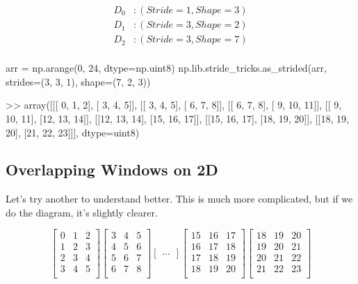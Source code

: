 \documentclass[oneside, 12pt]{report}
\begin{document}
\begin{align*}
D_0&:(Stride=1, Shape=3)\\
D_1&:(Stride=3, Shape=2)\\
D_2&:(Stride=3, Shape=7)\\
\end{align*}

\begin{python}
arr = np.arange(0, 24, dtype=np.uint8)
np.lib.stride_tricks.as_strided(arr, strides=(3, 3, 1), shape=(7, 2, 3))

>> array([[[ 0,  1,  2],
       	   [ 3,  4,  5]],
          [[ 3,  4,  5],
           [ 6,  7,  8]],
          [[ 6,  7,  8],
           [ 9, 10, 11]],
          [[ 9, 10, 11],
           [12, 13, 14]],
          [[12, 13, 14],
           [15, 16, 17]],
          [[15, 16, 17],
           [18, 19, 20]],
          [[18, 19, 20],
           [21, 22, 23]]], dtype=uint8)
\end{python}

\subsection{Overlapping Windows on 2D}

Let's try another to understand better. This is much more complicated, but if we do the diagram, it's slightly clearer.

\begin{equation*}
\begin{bmatrix}
0 & 1 & 2 \\
1 & 2 & 3 \\
2 & 3 & 4 \\
3 & 4 & 5 \\
\end{bmatrix}
\begin{bmatrix}
3 & 4 & 5 \\
4 & 5 & 6 \\
5 & 6 & 7 \\
6 & 7 & 8 \\
\end{bmatrix}
\begin{bmatrix}
...
\end{bmatrix}
\begin{bmatrix}
15 & 16 & 17 \\
16 & 17 & 18 \\
17 & 18 & 19 \\
18 & 19 & 20 \\
\end{bmatrix}
\begin{bmatrix}
18 & 19 & 20 \\
19 & 20 & 21 \\
20 & 21 & 22 \\
21 & 22 & 23 \\
\end{bmatrix}
\end{equation*}
\end{document}
